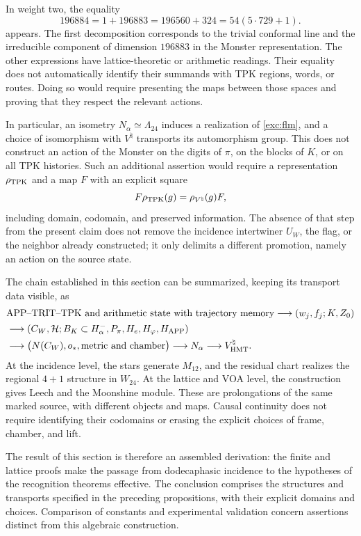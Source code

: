 In weight two, the equality
\[
 196884=1+196883=196560+324=54(5\cdot729+1).
\]
appears. The first decomposition corresponds to the trivial conformal line and the
irreducible component of dimension $196883$ in the Monster
representation. The other expressions have lattice-theoretic or
arithmetic readings. Their equality does not automatically identify their summands
with TPK regions, words, or routes. Doing so would require
presenting the maps between those spaces and proving that they respect the
relevant actions.

In particular, an isometry $N_\alpha\simeq\Lambda_{24}$ induces
a realization of \eqref{exc:flm}, and a choice of isomorphism
with $V^\natural$ transports its automorphism group. This does not
construct an action of the Monster on the digits of
$\pi$, on the blocks of $K$, or on all TPK histories.
Such an additional assertion would require a representation
$\rho_{\rm TPK}$ and a map $F$ with an explicit square
\[
 F\rho_{\rm TPK}(g)=\rho_{V^\natural}(g)F,
\]
including domain, codomain, and preserved information. The absence
of that step from the present claim does not remove the incidence
intertwiner $U_W$, the flag, or the neighbor already constructed; it only
delimits a different promotion, namely an action on the source state.

The chain established in this section can be summarized, keeping
its transport data visible, as
\begin{align*}
 &\text{APP--TRIT--TPK and arithmetic state with trajectory memory}
   \longrightarrow (w_j,f_j;K,Z_0)\\
 &\longrightarrow (C_W,\mathcal H;B_K\subset H^-_\alpha,
                   P_\pi,H_e,H_\varphi,H_{\rm APP})\\
 &\longrightarrow \bigl(N(C_W),o_*,\text{metric and chamber}\bigr)
   \longrightarrow N_\alpha
   \longrightarrow V^\natural_{\rm HMT}.
\end{align*}
At the incidence level, the stars generate $M_{12}$, and the
residual chart realizes the regional $4+1$ structure in $W_{24}$.
At the lattice and VOA level, the construction gives Leech and the
Moonshine module. These are prolongations of the same marked source, with
different objects and maps. Causal continuity does not require
identifying their codomains or erasing the explicit choices
of frame, chamber, and lift.

The result of this section is therefore an assembled derivation:
the finite and lattice proofs make the passage from dodecaphasic
incidence to the hypotheses of the recognition theorems effective.
The conclusion comprises the structures and transports specified in the
preceding propositions, with their explicit domains and choices.
Comparison of constants and experimental validation concern assertions
distinct from this algebraic construction.

